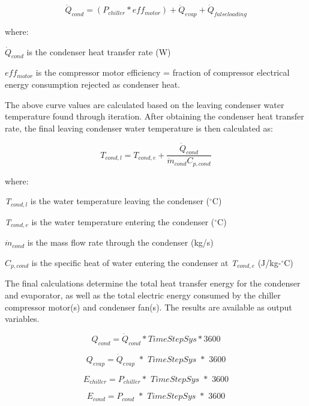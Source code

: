 \begin{equation}
{\dot{Q}_{cond}} = \left( {{P_{chiller}} * ef{f_{motor}}} \right) + {\dot{Q}_{evap}} + {\dot{Q}_{falseloading}}
\end{equation}

where:

\({\dot{Q}_{cond}}\) is the condenser heat transfer rate (W)

\(ef{f_{motor}}\) is the compressor motor efficiency = fraction of compressor electrical energy consumption rejected as condenser heat.

The above curve values are calculated based on the leaving condenser water temperature found through iteration. After obtaining the condenser heat transfer rate, the final leaving condenser water temperature is then calculated as:

\begin{equation}
  T_{cond,l} = T_{cond,e} + \frac{\dot{Q}_{cond}}{\dot{m}_{cond} C_{p,cond}}
\end{equation}

where:

\emph{T\(_{cond,l}\)} is the water temperature leaving the condenser (\(^{\circ}\)C)

\emph{T\(_{cond,e}\)} is the water temperature entering the condenser (\(^{\circ}\)C)

\({\dot{m}_{cond}}\) is the mass flow rate through the condenser (kg/s)

\({C_{p,cond}}\) is the specific heat of water entering the condenser at \emph{T\(_{cond,e}\)} (J/kg-\(^{\circ}\)C)

The final calculations determine the total heat transfer energy for the condenser and evaporator, as well as the total electric energy consumed by the chiller compressor motor(s) and condenser fan(s). The results are available as output variables.

\begin{equation}
{Q_{cond}} = {\dot{Q}_{cond}}*TimeStepSys*3600
\end{equation}

\begin{equation}
{Q_{evap}} = {\dot{Q}_{evap}}\,\,*\,\,TimeStepSys\,\,*\,\,3600
\end{equation}

\begin{equation}
{E_{chiller}} = {P_{chiller}}*\,\,TimeStepSys\,\,*\,\,3600
\end{equation}

\begin{equation}
{E_{cond}} = {P_{cond}}\,\, * \,\,TimeStepSys\,\,*\,\,3600
\end{equation}

